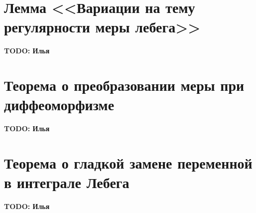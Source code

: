 \documentclass[paper=a4, fontsize=13.2pt]{article}
\begin{document}
\section{Лемма <<Вариации на тему регулярности меры лебега>>}
\textbf{TODO: Илья}
\section{Теорема о преобразовании меры при диффеоморфизме}
\textbf{TODO: Илья}
\section{Теорема о гладкой замене переменной в интеграле Лебега}
\textbf{TODO: Илья}


\end{document}
